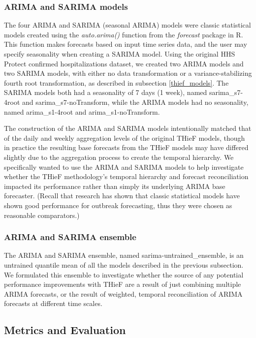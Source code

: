 \documentclass[12pt]{article}
\begin{document}
\subsubsection{ARIMA and SARIMA models} \label{sarima_models}
The four ARIMA and SARIMA (seasonal ARIMA) models were classic statistical models created using the \textit{auto.arima()} function from the \textit{forecast} package in R. This function makes forecasts based on input time series data, and the user may specify seasonality when creating a SARIMA model. Using the original HHS Protect confirmed hospitalizations dataset, we created two ARIMA models and two SARIMA models, with either no data transformation or a variance-stabilizing fourth root transformation, as described in subsection \ref{thief_models}. The SARIMA models both had a seasonality of 7 days (1 week), named sarima\_s7-4root and sarima\_s7-noTransform, while the ARIMA models had no seasonality, named arima\_s1-4root and arima\_s1-noTransform.

The construction of the ARIMA and SARIMA models intentionally matched that of the daily and weekly aggregation levels of the original THieF models, though in practice the resulting base forecasts from the THieF models may have differed slightly due to the aggregation process to create the temporal hierarchy. We specifically wanted to use the ARIMA and SARIMA models to help investigate whether the THieF methodology's temporal hierarchy and forecast reconciliation impacted its performance rather than simply its underlying ARIMA base forecaster. (Recall that research has shown that classic statistical models have shown good performance for outbreak forecasting, thus they were chosen as reasonable comparators\cite{lauer}.)

\subsubsection{ARIMA and SARIMA ensemble} \label{sarima_ensemble}
The ARIMA and SARIMA ensemble, named sarima-untrained\_ensemble, is an untrained quantile mean of all the models described in the previous subsection. We formulated this ensemble to investigate whether the source of any potential performance improvements with THieF are a result of just combining multiple ARIMA forecasts, or the result of weighted, temporal reconciliation of ARIMA forecasts at different time scales.

\subsection{Metrics and Evaluation} \label{metrics_and_evaluation}
\end{document}
